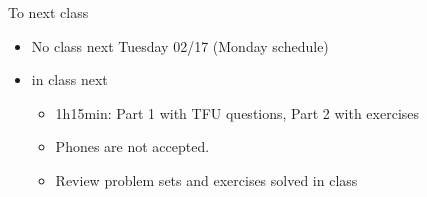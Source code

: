 \begin{frame}{To next class}
\begin{itemize}
    \item No class next Tuesday 02/17 (Monday schedule)
    \item {} in class next 
    \begin{itemize}
        \item 1h15min: Part 1 with TFU questions, Part 2 with exercises
        \item {} Phones are not accepted.
        \item Review problem sets and exercises solved in class
    \end{itemize}
\end{itemize}
\end{frame}
